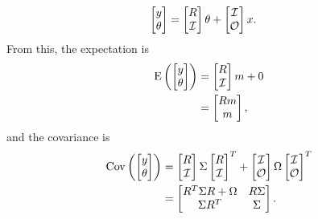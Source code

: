 \documentclass[letter, 10pt]{article}
\begin{document}
\begin{align*}
  \begin{bmatrix}
    y \\ \theta
  \end{bmatrix}
  &=
    \begin{bmatrix}
      R \\ \mathcal{I}
    \end{bmatrix} \theta +
  \begin{bmatrix}
    \mathcal{I} \\ \mathcal{O}
  \end{bmatrix} x.
\end{align*}
%
%
From this, the expectation is 
\begin{align*}
  \mathrm{E} 
  \left(
  \begin{bmatrix}
    y \\ \theta
  \end{bmatrix}
  \right)
  &=
    \begin{bmatrix}
      R \\ \mathcal{I}
    \end{bmatrix} m + 0 \\
  &= \begin{bmatrix}
      Rm \\ m
    \end{bmatrix} ,
\end{align*}
and the covariance is
\begin{align*}
  \mathrm{Cov} 
  \left(
  \begin{bmatrix}
    y \\ \theta
  \end{bmatrix}
  \right)
  &=
    \begin{bmatrix}
      R \\ \mathcal{I}
    \end{bmatrix} \Sigma
  \begin{bmatrix}
    R \\ \mathcal{I}
  \end{bmatrix}^T +
  \begin{bmatrix}
    \mathcal{I} \\ \mathcal{O}
  \end{bmatrix} \Omega
  \begin{bmatrix}
    \mathcal{I} \\ \mathcal{O}
  \end{bmatrix} ^T \\
  &=
    \begin{bmatrix}
      R^T \Sigma R + \Omega & R\Sigma \\
      \Sigma R^T & \Sigma
    \end{bmatrix}.
\end{align*}
\end{document}
